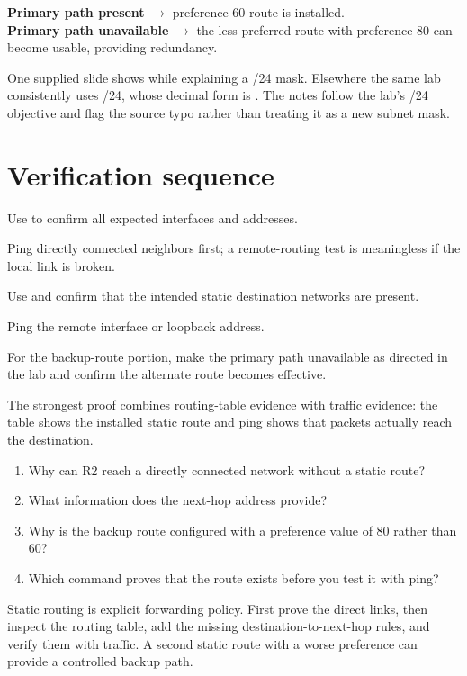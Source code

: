 \begin{conceptmap}
\textbf{Primary path present} $\rightarrow$ preference 60 route is installed.\\
\textbf{Primary path unavailable} $\rightarrow$ the less-preferred route with preference 80 can become usable, providing redundancy.
\end{conceptmap}

\begin{pitfall}
One supplied slide shows  while explaining a /24 mask. Elsewhere the same lab consistently uses /24, whose decimal form is . The notes follow the lab's /24 objective and flag the source typo rather than treating it as a new subnet mask.
\end{pitfall}

\section{Verification sequence}
\begin{netsteps}
\item Use  to confirm all expected interfaces and addresses.
\item Ping directly connected neighbors first; a remote-routing test is meaningless if the local link is broken.
\item Use  and confirm that the intended static destination networks are present.
\item Ping the remote interface or loopback address.
\item For the backup-route portion, make the primary path unavailable as directed in the lab and confirm the alternate route becomes effective.
\end{netsteps}

\begin{verifybox}
The strongest proof combines routing-table evidence with traffic evidence: the table shows the installed static route and ping shows that packets actually reach the destination.
\end{verifybox}

\begin{quickcheck}
\begin{enumerate}
\item Why can R2 reach a directly connected network without a static route?
\item What information does the next-hop address provide?
\item Why is the backup route configured with a preference value of 80 rather than 60?
\item Which command proves that the route exists before you test it with ping?
\end{enumerate}
\end{quickcheck}

\begin{chapterrecap}
Static routing is explicit forwarding policy. First prove the direct links, then inspect the routing table, add the missing destination-to-next-hop rules, and verify them with traffic. A second static route with a worse preference can provide a controlled backup path.
\end{chapterrecap}
